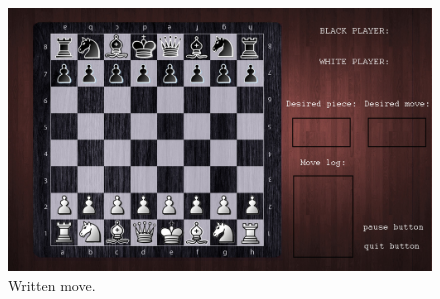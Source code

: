\documentclass[12pt, a4paper]{article}
\begin{document}
\begin{figure}[ht!]
\centering
\includegraphics[width=0.9\linewidth]{figures/writtenimplementation.jpg}
\caption{Written move.}
\end{figure}

\vfill
\clearpage
\end{document}
